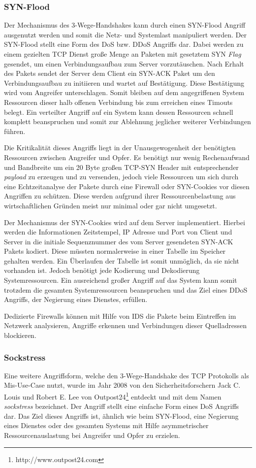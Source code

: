 \subsubsection{SYN-Flood}
Der Mechanismus des 3-Wege-Handshakes kann durch einen SYN-Flood Angriff ausgenutzt werden und somit die Netz- und Systemlast manipuliert werden. Der SYN-Flood stellt eine Form des \ac{DoS} bzw. \ac{DDoS} Angriffs dar. Dabei werden zu einem gezielten \ac{TCP} Dienst große Menge an Paketen mit gesetztem SYN \textit{Flag} gesendet, um einen Verbindungsaufbau zum Server vorzutäuschen. Nach Erhalt des Pakets sendet der Server dem Client ein SYN-ACK Paket um den Verbindungsaufbau zu initiieren und wartet auf Bestätigung. Diese Bestätigung wird vom Angreifer unterschlagen. Somit bleiben auf dem angegriffenen System Ressourcen dieser halb offenen Verbindung bis zum erreichen eines Timouts belegt. Ein verteilter Angriff auf ein System kann dessen Ressourcen schnell komplett beanspruchen und somit zur Ablehnung jeglicher weiterer Verbindungen führen.

Die Kritikalität dieses Angriffs liegt in der Unausgewogenheit der benötigten Ressourcen zwischen Angreifer und Opfer. Es benötigt nur wenig Rechenaufwand und Bandbreite um ein 20 Byte großen \ac{TCP}-SYN Header mit entsprechender \textit{payload} zu erzeugen und zu versenden, jedoch viele Ressourcen um sich durch eine Echtzeitanalyse der Pakete durch eine Firewall oder SYN-Cookies vor diesen Angriffen zu schützen. Diese werden aufgrund ihrer Ressourcenbelastung aus wirtschaftlichen Gründen meist nur minimal oder gar nicht umgesetzt.

Der Mechanismus der SYN-Cookies wird auf dem Server implementiert. Hierbei werden die Informationen Zeitstempel, \ac{IP} Adresse und Port von Client und Server in die initiale Sequenznummer des vom Server gesendeten SYN-ACK Pakets kodiert. Diese müssten normalerweise in einer Tabelle im Speicher gehalten werden. Ein Überlaufen der Tabelle ist somit unmöglich, da sie nicht vorhanden ist. Jedoch benötigt jede Kodierung und Dekodierung Systemressourcen. Ein ausreichend großer Angriff auf das System kann somit trotzdem die gesamten Systemressourcen beanspruchen und das Ziel eines \ac{DDoS} Angriffs, der Negierung eines Dienstes, erfüllen.

Dedizierte Firewalls können mit Hilfe von \ac{IDS} die Pakete beim Eintreffen im Netzwerk analysieren, Angriffe erkennen und Verbindungen dieser Quelladressen blockieren.

\subsubsection{Sockstress}
Eine weitere Angriffsform, welche den 3-Wege-Handshake des \ac{TCP} Protokolls als Mis-Use-Case nutzt, wurde im Jahr 2008 von den Sicherheitsforschern Jack C. Louis und Robert E. Lee von Outpost24\footnote{http://www.outpost24.com} entdeckt und mit dem Namen \textit{sockstress} bezeichnet. Der Angriff stellt eine einfache Form eines \ac{DoS} Angriffs dar. Das Ziel dieses Angriffs ist, ähnlich wie beim SYN-Flood, eine Negierung eines Dienstes oder des gesamten Systems mit Hilfe asymmetrischer Ressourcenauslastung bei Angreifer und Opfer zu erzielen.

